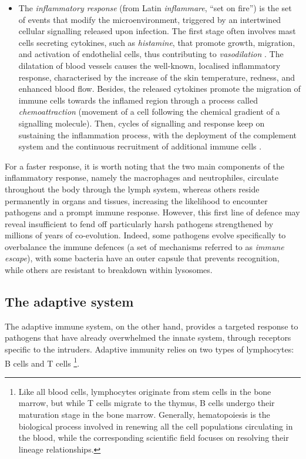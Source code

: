\begin{itemize}
    \item The \emph{inflammatory response} (from Latin \emph{inflammare}, \enquote{set on fire}) is the set of events that modify the microenvironment, triggered by an intertwined cellular signalling released upon infection. The first stage often involves mast cells secreting cytokines, such as \emph{histamine}, that promote growth, migration, and activation of endothelial cells, thus contributing to \emph{vasodilation} \autocite{ribatti_etal20}. The dilatation of blood vessels causes the well-known, localised inflammatory response, characterised by the increase of the skin temperature, redness, and enhanced blood flow. Besides, the released cytokines promote the migration of immune cells towards the inflamed region through a process called \emph{chemoattraction} (movement of a cell following the chemical gradient of a signalling molecule). Then, cycles of signalling and response keep on sustaining the inflammation process, with the deployment of the complement system and the continuous recruitment of additional immune cells \autocite{mollaei_etal20}. 

\end{itemize}

For a faster response, it is worth noting that the two main components of the inflammatory response, namely the macrophages and neutrophiles, circulate throughout the body through the lymph system, whereas others reside permanently in organs and tissues, increasing the likelihood to encounter pathogens and a prompt immune response. However, this first line of defence may reveal insufficient to fend off particularly harsh pathogens strengthened by millions of years of co-evolution. Indeed, some pathogens evolve specifically to overbalance the immune defences (a set of mechanisms referred to as \emph{immune escape}), with some bacteria have an outer capsule that prevents recognition, while others are resistant to breakdown within lysosomes. 


\subsection{The adaptive system}
\label{subsec:adaptive-system}
The adaptive immune system, on the other hand, provides a targeted response to pathogens that have already overwhelmed the innate system, through receptors specific to the intruders. Adaptive immunity relies on two types of lymphocytes: B cells and T cells \footnote{Like all blood cells, lymphocytes originate from stem cells in the bone marrow, but while T cells migrate to the thymus, B cells undergo their maturation stage in the bone marrow. Generally, \Gls{hematopoiesis} is the biological process involved in renewing all the cell populations circulating in the blood, while the corresponding scientific field focuses on resolving their lineage relationships.}. 

